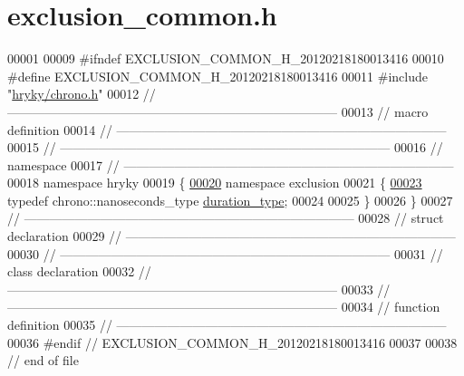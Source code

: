 \hypertarget{exclusion__common_8h_source}{\section{exclusion\-\_\-common.\-h}
}

\begin{DoxyCode}
00001 
00009 \textcolor{preprocessor}{#ifndef EXCLUSION\_COMMON\_H\_20120218180013416}
00010 \textcolor{preprocessor}{}\textcolor{preprocessor}{#define EXCLUSION\_COMMON\_H\_20120218180013416}
00011 \textcolor{preprocessor}{}\textcolor{preprocessor}{#include "\hyperlink{chrono_8h}{hryky/chrono.h}"}
00012 \textcolor{comment}{//
      ------------------------------------------------------------------------------}
00013 \textcolor{comment}{// macro definition}
00014 \textcolor{comment}{//
      ------------------------------------------------------------------------------}
00015 \textcolor{comment}{//
      ------------------------------------------------------------------------------}
00016 \textcolor{comment}{// namespace}
00017 \textcolor{comment}{//
      ------------------------------------------------------------------------------}
00018 \textcolor{keyword}{namespace }hryky
00019 \{
\hypertarget{exclusion__common_8h_source_l00020}{}\hyperlink{namespacehryky_1_1exclusion}{00020} \textcolor{keyword}{namespace }exclusion
00021 \{
\hypertarget{exclusion__common_8h_source_l00023}{}\hyperlink{namespacehryky_1_1exclusion_ad196e82d77cdc66488c1ad69363688b8}{00023}     \textcolor{keyword}{typedef} chrono::nanoseconds\_type \hyperlink{namespacehryky_1_1exclusion_ad196e82d77cdc66488c1ad69363688b8}{duration_type};
00024 
00025 \}
00026 \}
00027 \textcolor{comment}{//
      ------------------------------------------------------------------------------}
00028 \textcolor{comment}{// struct declaration}
00029 \textcolor{comment}{//
      ------------------------------------------------------------------------------}
00030 \textcolor{comment}{//
      ------------------------------------------------------------------------------}
00031 \textcolor{comment}{// class declaration}
00032 \textcolor{comment}{//
      ------------------------------------------------------------------------------}
00033 \textcolor{comment}{//
      ------------------------------------------------------------------------------}
00034 \textcolor{comment}{// function definition}
00035 \textcolor{comment}{//
      ------------------------------------------------------------------------------}
00036 \textcolor{preprocessor}{#endif // EXCLUSION\_COMMON\_H\_20120218180013416}
00037 \textcolor{preprocessor}{}
00038 \textcolor{comment}{// end of file}
\end{DoxyCode}

